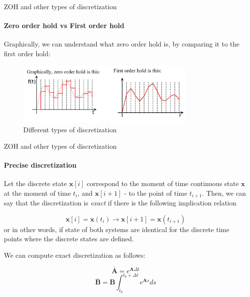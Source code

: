 \documentclass{beamer}
\begin{document}
\begin{frame}{ZOH and other types of discretization}
\framesubtitle{Zero order hold vs First order hold}
\begin{flushleft}

Graphically, we can understand what zero order hold is, by comparing it to the first order hold:

\begin{figure} [h!]
\begin{center}
\includegraphics[width=3.5in]{ZOH.PNG}
\end{center} 
\caption{Different types of discretization} \label{F:ZOH}
\end{figure}

\end{flushleft}
\end{frame}


\begin{frame}{ZOH and other types of discretization}
\framesubtitle{Precise discretization}
\begin{flushleft}

Let the discrete state $\mathbf x[i]$ correspond to the moment of time continuous state $\mathbf x$ at the moment of time $t_i$, and $\mathbf x[i + 1]$ - to the point of time $t_{i+1}$. Then, we can say that the discretization is \emph{exact} if there is the following implication relation

\[
\mathbf x[i] = \mathbf x(t_i) \rightarrow 
\mathbf x[i+1] = \mathbf x(t_{i+1})
\]
%
or in other words, if state of both systems are identical for the discrete time points where the discrete states are defined. 

We can compute exact discretization as follows:

\[
\bar{\mathbf A} = e^{\mathbf A \Delta t}
\]
\[
\bar{\mathbf B} = \mathbf B \int_{t_0}^{t_0 + \Delta t} e^{\mathbf A s} ds
\]


\end{flushleft}
\end{frame}
\end{document}
